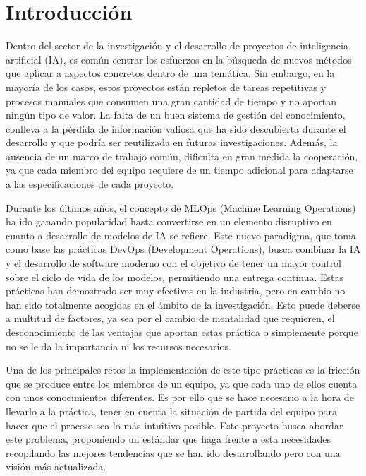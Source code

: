 \section{Introducción}
Dentro del sector de la investigación y el desarrollo de proyectos de inteligencia artificial (IA),
es común centrar los esfuerzos en la búsqueda de nuevos métodos que aplicar a aspectos 
concretos dentro de una temática. Sin embargo, en la mayoría de los casos,
estos proyectos están repletos de tareas repetitivas y procesos manuales que consumen una gran
cantidad de tiempo y no aportan ningún tipo de valor. La falta de un buen sistema de gestión
del conocimiento, conlleva a la pérdida de información valiosa que ha sido descubierta durante el
desarrollo y que podría ser reutilizada en futuras investigaciones. Además, la ausencia de un 
marco de trabajo común, dificulta en gran medida la cooperación, ya que cada miembro del equipo requiere 
de un tiempo adicional para adaptarse a las especificaciones de cada proyecto.\medskip

Durante los últimos años, el concepto de MLOps (Machine Learning Operations) ha ido ganando popularidad 
hasta convertirse en un elemento disruptivo en cuanto a desarrollo de modelos de IA se refiere. Este 
nuevo paradigma, que toma como base las prácticas DevOps (Development Operations), busca combinar la IA 
y el desarrollo de software moderno con el objetivo de tener un mayor control sobre el ciclo de 
vida de los modelos, permitiendo una entrega continua. Estas prácticas han demostrado 
ser muy efectivas en la industria, pero en cambio no han sido totalmente acogidas en el ámbito de la 
investigación. Esto puede deberse a multitud de factores, ya sea por el cambio de mentalidad que requieren, el
desconocimiento de las ventajas que aportan estas práctica o simplemente porque no se le da la
importancia ni los recursos necesarios.\medskip

Una de los principales retos la implementación de este tipo prácticas es la fricción que se produce
entre los miembros de un equipo, ya que cada uno de ellos cuenta con unos conocimientos diferentes.
Es por ello que se hace necesario a la hora de llevarlo a la práctica, tener en cuenta la situación
de partida del equipo para hacer que el proceso sea lo más intuitivo posible. Este proyecto busca 
abordar este problema, proponiendo un estándar que haga frente a esta necesidades recopilando las 
mejores tendencias que se han ido desarrollando pero con una visión más actualizada.



